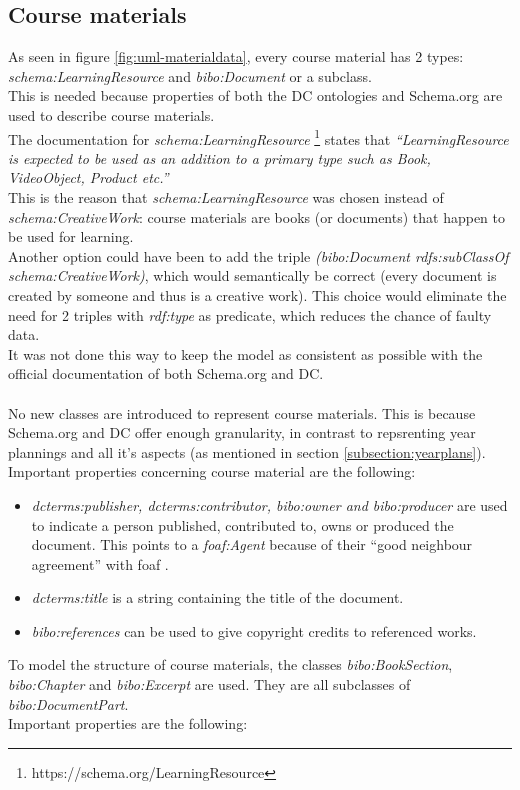\documentclass[a4paper]{report}
\begin{document}
    \subsection{Course materials}

    As seen in figure \ref{fig:uml-materialdata}, every course material has 2 types: \textit{schema:LearningResource} and \textit{bibo:Document} or a subclass.\\
    This is needed because properties of both the DC ontologies and Schema.org are used to describe course materials.\\
    The documentation for \textit{schema:LearningResource} \footnote{https://schema.org/LearningResource} states that \textit{``LearningResource is expected to be used as an addition to a primary type such as Book, VideoObject, Product etc.''}\\
    This is the reason that \textit{schema:LearningResource} was chosen instead of \textit{schema:CreativeWork}: course materials are books (or documents) that happen to be used for learning.\\
    Another option could have been to add the triple \textit{(bibo:Document rdfs:subClassOf schema:CreativeWork)}, which would semantically be correct (every document is created by someone and thus is a creative work).
    This choice would eliminate the need for 2 triples with \textit{rdf:type} as predicate, which reduces the chance of faulty data.\\
    It was not done this way to keep the model as consistent as possible with the official documentation of both Schema.org and DC.\\ \\
    No new classes are introduced to represent course materials. This is because Schema.org and DC offer enough granularity, in contrast to repsrenting year plannings and all it's aspects (as mentioned in section \ref{subsection:yearplans}).\\
    Important properties concerning course material are the following:
    \begin{itemize}
        \item \textit{dcterms:publisher, dcterms:contributor, bibo:owner and bibo:producer} are used to indicate a person published, contributed to, owns or produced the document.
        This points to a \textit{foaf:Agent} because of their ``good neighbour agreement'' with foaf \cite{dc}.
        \item \textit{dcterms:title} is a string containing the title of the document.
        \item \textit{bibo:references} can be used to give copyright credits to referenced works.
    \end{itemize}
    To model the structure of course materials, the classes \textit{bibo:BookSection}, \textit{bibo:Chapter} and \textit{bibo:Excerpt} are used. They are all subclasses of \textit{bibo:DocumentPart}.\\
    Important properties are the following:
\end{document}
